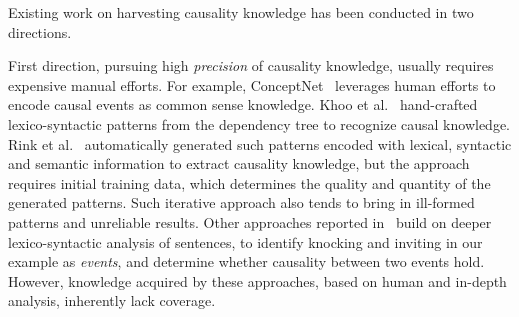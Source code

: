%

Existing work on harvesting causality knowledge has been conducted in
two directions.

First direction, pursuing high {\em precision} of
causality knowledge, usually requires expensive manual efforts.
For example, ConceptNet~\cite{HavasiSALAM10} leverages human efforts
to encode causal events as common sense knowledge.
Khoo et al.~ hand-crafted
lexico-syntactic patterns from the dependency tree to recognize
causal knowledge.  Rink et al.~
automatically generated such patterns encoded with
lexical, syntactic and semantic information to extract
causality knowledge, but the approach requires initial training data,
which determines the quality and quantity of the generated patterns.
Such iterative approach also tends to bring in ill-formed patterns
and unreliable results.
Other approaches reported in~\cite{gordon2012copa} build on deeper
lexico-syntactic analysis of sentences,
to identify knocking and inviting in our example as
\emph{events}, and determine whether causality between two events hold.
However, knowledge acquired by these approaches,
based on human and in-depth analysis, inherently lack coverage.
	

